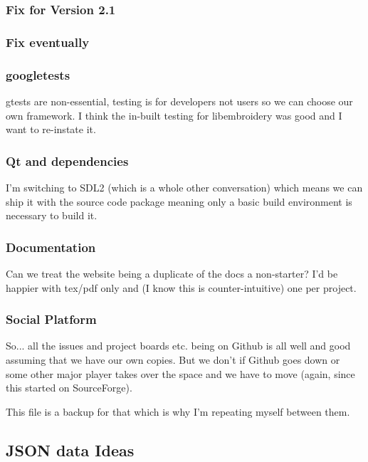 \documentclass[a4paper]{report}
\begin{document}
\subsubsection{Fix for Version 2.1}

\subsubsection{Fix eventually}

\subsubsection{googletests}

gtests are non-essential, testing is for developers not users so we can
choose our own framework. I think the in-built testing for libembroidery
was good and I want to re-instate it.

\subsubsection{Qt and dependencies}

I'm switching to SDL2 (which is a whole other conversation) which means
we can ship it with the source code package meaning only a basic build
environment is necessary to build it.

\subsubsection{Documentation}

Can we treat the website being a duplicate of the docs a non-starter?
I'd be happier with tex/pdf only and (I know this is counter-intuitive)
one per project.

\subsubsection{Social Platform}

So... all the issues and project boards etc. being on Github is all
well and good assuming that we have our own copies. But we don't if
Github goes down or some other major player takes over the space and we
have to move (again, since this started on SourceForge).

This file is a backup for that which is why I'm repeating myself between
them.

\subsection{JSON data Ideas}
\end{document}
